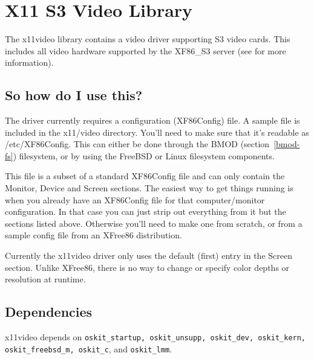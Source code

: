 %
% 
%

\section{X11 S3 Video Library}
\label{xvideo}

The x11video library contains a video driver supporting S3 video
cards.  This includes all video hardware supported by the XF86_S3
server (see 
for more information). 

\subsection{So how do I use this?}

The driver currently requires a configuration (XF86Config) file.  A
sample file is included in the x11/video directory.  You'll need to
make sure that it's readable as /etc/XF86Config.  This can either be
done through the BMOD (section~\ref{bmod-fs}) filesystem,
or by using the FreeBSD or Linux filesystem components.
	
This file is a subset of a standard XF86Config file and can only
contain the Monitor, Device and Screen sections.  The easiest way to
get things running is when you already have an XF86Config file for that
computer/monitor configuration.  In that case you can just strip out
everything from it but the sections listed above.  Otherwise you'll
need to make one from scratch, or from a sample config file from an
XFree86 distribution.

Currently the x11video driver only uses the default (first) entry in
the Screen section.  Unlike XFree86, there is no way to change or
specify color depths or resolution at runtime.

\subsection{Dependencies}

x11video depends on {\tt oskit_startup, oskit_unsupp, oskit_dev,
oskit_kern, oskit_freebsd_m, oskit_c}, and {\tt oskit_lmm}.

